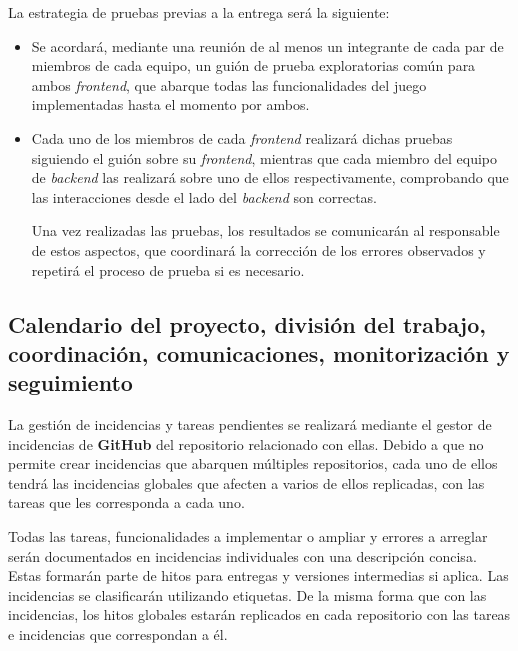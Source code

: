 \documentclass[11pt, a4paper, titlepage]{article}
\begin{document}
\begin{itemize}
    La estrategia de pruebas previas a la entrega será la siguiente:
    \begin{itemize}
        \item Se acordará, mediante una reunión de al menos un integrante de cada par de miembros de cada equipo, un guión de prueba exploratorias común para ambos \textit{frontend}, que abarque todas las funcionalidades del juego implementadas hasta el momento por ambos.

        \item Cada uno de los miembros de cada \textit{frontend} realizará dichas pruebas siguiendo el guión sobre su \textit{frontend}, mientras que cada miembro del equipo de \textit{backend} las realizará sobre uno de ellos respectivamente, comprobando que las interacciones desde el lado del \textit{backend} son correctas.

        Una vez realizadas las pruebas, los resultados se comunicarán al responsable de estos aspectos, que coordinará la corrección de los errores observados y repetirá el proceso de prueba si es necesario.
    \end{itemize}
\end{itemize}

\subsection{Calendario del proyecto, división del trabajo, coordinación, comunicaciones, monitorización y seguimiento}


\item La gestión de incidencias y tareas pendientes se realizará mediante el gestor de incidencias de \textbf{GitHub} del repositorio relacionado con ellas. Debido a que no permite crear incidencias que abarquen múltiples repositorios, cada uno de ellos tendrá las incidencias globales que afecten a varios de ellos replicadas, con las tareas que les corresponda a cada uno.

    \item Todas las tareas, funcionalidades a implementar o ampliar y errores a arreglar serán documentados en incidencias individuales con una descripción concisa. Estas formarán parte de hitos para entregas y versiones intermedias si aplica. Las incidencias se clasificarán utilizando etiquetas. De la misma forma que con las incidencias, los hitos globales estarán replicados en cada repositorio con las tareas e incidencias que correspondan a él.
\end{document}
